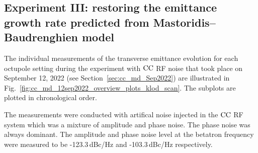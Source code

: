  \subsection{Experiment III: restoring the emittance growth rate predicted from Mastoridis--Baudrenghien model}\label{subsec:emit_growth_cc_md_sep2022}
 The individual measurements of the transverse emittance evolution for each octupole setting during the experiment with ${\mathrm{CC}}$ RF noise that took place on September 12, 2022 (see Section~\ref{sec:cc_md_Sep2022}) are illustrated in Fig.~\ref{fig:cc_md_12sep2022_overview_plots_klod_scan}. The subplots are plotted in chronological order.
 
 The measurements were conducted with artifical noise injected in the ${\mathrm{CC}}$ RF system which was a mixture of amplitude and phase noise. The phase noise was always dominant. The amplitude and phase noise level at the betatron frequency were measured to be -123.3\,dBc/Hz and -103.3\,dBc/Hz respectively. %
 
